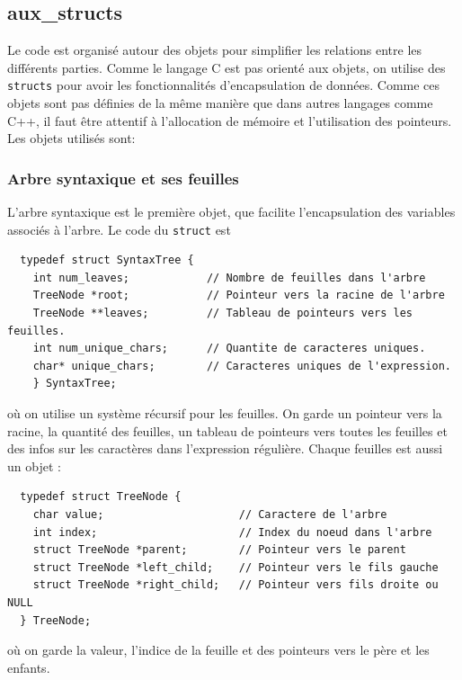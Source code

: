 \documentclass[12pt]{article}
\begin{document}
\subsection{aux\_structs}
\label{sec:structs}
Le code est organisé autour des objets pour simplifier les relations entre les différents parties. Comme le langage C est pas orienté aux objets, on utilise des \texttt{structs} pour avoir les fonctionnalités d'encapsulation de données. Comme ces objets sont pas définies de la même manière que dans autres langages comme C++, il faut être attentif à l'allocation de mémoire et l'utilisation des pointeurs. Les objets utilisés sont:

\subsubsection*{Arbre syntaxique et ses feuilles}
L'arbre syntaxique est le première objet, que facilite l'encapsulation des variables associés à l'arbre. Le code du \texttt{struct} est

\begin{lstlisting}
  typedef struct SyntaxTree {
    int num_leaves;            // Nombre de feuilles dans l'arbre
    TreeNode *root;            // Pointeur vers la racine de l'arbre
    TreeNode **leaves;         // Tableau de pointeurs vers les feuilles.
    int num_unique_chars;      // Quantite de caracteres uniques.
    char* unique_chars;        // Caracteres uniques de l'expression.
    } SyntaxTree;
  \end{lstlisting}

  \noindent où on utilise un système récursif pour les feuilles. On garde un pointeur vers la racine, la quantité des feuilles, un tableau de pointeurs vers toutes les feuilles et des infos sur les caractères dans l'expression régulière. Chaque feuilles est aussi un objet : 

  \begin{lstlisting}
  typedef struct TreeNode {
    char value;                     // Caractere de l'arbre
    int index;                      // Index du noeud dans l'arbre
    struct TreeNode *parent;        // Pointeur vers le parent
    struct TreeNode *left_child;    // Pointeur vers le fils gauche
    struct TreeNode *right_child;   // Pointeur vers fils droite ou NULL
  } TreeNode;
  \end{lstlisting}

  \noindent où on garde la valeur, l'indice de la feuille et des pointeurs vers le père et les enfants.
  
\end{document}

